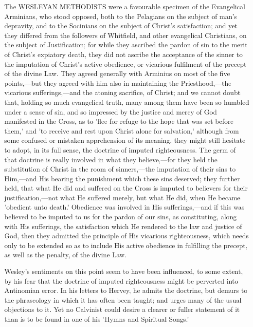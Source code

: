 \documentclass[
]{book}
\begin{document}
The WESLEYAN METHODISTS were a favourable specimen of the Evangelical Arminians, who stood opposed, both to the Pelagians on the subject of man's depravity, and to the Socinians on the subject of Christ's satisfaction; and yet they differed from the followers of Whitfield, and other evangelical Christians, on the subject of Justification; for while they ascribed the pardon of sin to the merit of Christ's expiatory death, they did not ascribe the acceptance of the sinner to the imputation of Christ's active obedience, or vicarious fulfilment of the precept of the divine Law. They agreed generally with Arminius on most of the five points,---but they agreed with him also in maintaining the Priesthood,---the vicarious sufferings,---and the atoning sacrifice, of Christ; and we cannot doubt that, holding so much evangelical truth, many among them have been so humbled under a sense of sin, and so impressed by the justice and mercy of God manifested in the Cross, as to 'flee for refuge to the hope that was set before them,' and 'to receive and rest upon Christ alone for salvation,' although from some confused or mistaken apprehension of its meaning, they might still hesitate to adopt, in its full sense, the doctrine of imputed righteousness. The germ of that doctrine is really involved in what they believe,---for they held the substitution of Christ in the room of sinners,---the imputation of their sins to Him,---and His bearing the punishment which these sins deserved; they further held, that what He did and suffered on the Cross is imputed to believers for their justification,---not what He suffered merely, but what He did, when He became 'obedient unto death.' Obedience was involved in His sufferings,---and if this was believed to be imputed to us for the pardon of our sins, as constituting, along with His sufferings, the satisfaction which He rendered to the law and justice of God, then they admitted the principle of His vicarious righteousness, which needs only to be extended so as to include His active obedience in fulfilling the precept, as well as the penalty, of the divine Law.

Wesley's sentiments on this point seem to have been influenced, to some extent, by his fear that the doctrine of imputed righteousness might be perverted into Antinomian error. In his letters to Hervey, he admits the doctrine, but demurs to the phraseology in which it has often been taught; and urges many of the usual objections to it. Yet no Calvinist could desire a clearer or fuller statement of it than is to be found in one of his 'Hymns and Spiritual Songs.'
\end{document}
